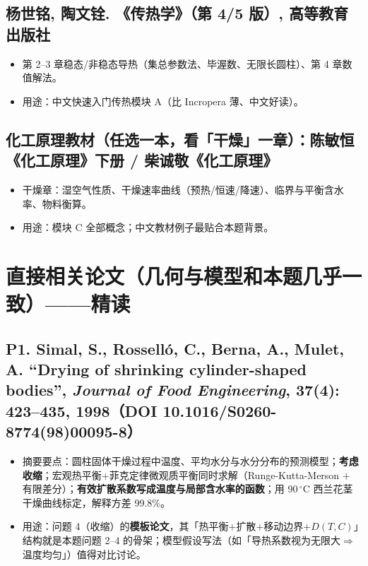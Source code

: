 \documentclass[12pt,a4paper]{ctexart}
\begin{document}
\subsection{杨世铭, 陶文铨. 《传热学》（第 4/5 版）, 高等教育出版社}
\begin{itemize}
\item 第 2--3 章稳态/非稳态导热（集总参数法、毕渥数、无限长圆柱）、第 4 章数值解法。
\item 用途：中文快速入门传热模块 A（比 Incropera 薄、中文好读）。
\end{itemize}

\subsection{化工原理教材（任选一本，看「干燥」一章）：陈敏恒《化工原理》下册 / 柴诚敬《化工原理》}
\begin{itemize}
\item 干燥章：湿空气性质、干燥速率曲线（预热/恒速/降速）、临界与平衡含水率、物料衡算。
\item 用途：模块 C 全部概念；中文教材例子最贴合本题背景。
\end{itemize}

\section{直接相关论文（几何与模型和本题几乎一致）——精读}

\subsection{P1. Simal, S., Rossell\'o, C., Berna, A., Mulet, A. ``Drying of shrinking cylinder-shaped bodies'', \textit{Journal of Food Engineering}, 37(4): 423--435, 1998（DOI 10.1016/S0260-8774(98)00095-8）\quad [摘要已核]}
\begin{itemize}
\item 摘要要点：圆柱固体干燥过程中温度、平均水分与水分分布的预测模型；\textbf{考虑收缩}；宏观热平衡$+$菲克定律微观质平衡同时求解（Runge-Kutta-Merson $+$ 有限差分）；\textbf{有效扩散系数写成温度与局部含水率的函数}；用 90\,$^\circ$C 西兰花茎干燥曲线标定，解释方差 99.8\%。
\item 用途：问题 4（收缩）的\textbf{模板论文}，其「热平衡$+$扩散$+$移动边界$+D(T,C)$」结构就是本题问题 2--4 的骨架；模型假设写法（如「导热系数视为无限大$\Rightarrow$温度均匀」）值得对比讨论。
\end{itemize}
\end{document}
